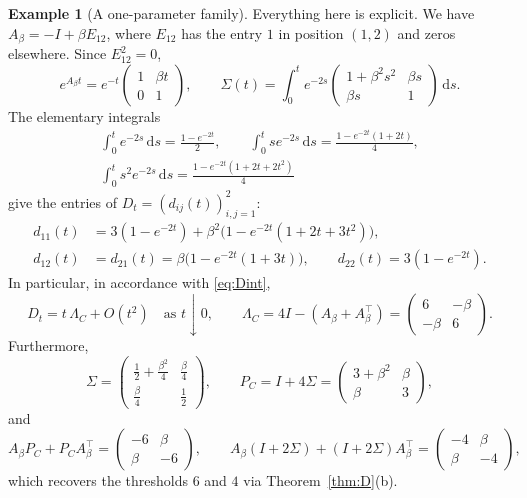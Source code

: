\documentclass[11pt]{amsart}
\numberwithin{equation}{section}
\theoremstyle{definition}
\newtheorem{example}[theorem]{Example}
\theoremstyle{remark}
\newcommand{\dd}{\,\mathrm{d}}
\newcommand{\tp}{\top}
\begin{document}
\begin{example}[A one-parameter family]
Everything here is explicit. We have $A_\beta=-I+\beta E_{12}$, where $E_{12}$ has the entry $1$ in position $(1,2)$
and zeros elsewhere. Since $E_{12}^2=0$,
\[
e^{A_\beta t}=e^{-t}\begin{pmatrix}1&\beta t\\0&1\end{pmatrix},\qquad
\Sigma(t)=\int_0^te^{-2s}\begin{pmatrix}1+\beta^2s^2&\beta s\\\beta s&1\end{pmatrix}\dd s .
\]
The elementary integrals
\begin{gather*}
\int_0^te^{-2s}\dd s=\frac{1-e^{-2t}}2,\qquad\int_0^tse^{-2s}\dd s=\frac{1-e^{-2t}(1+2t)}4,\\
\int_0^ts^2e^{-2s}\dd s=\frac{1-e^{-2t}(1+2t+2t^2)}4
\end{gather*}
give the entries of $D_t=(d_{ij}(t))_{i,j=1}^2$:
\begin{align*}
d_{11}(t)&=3(1-e^{-2t})+\beta^2\bigl(1-e^{-2t}(1+2t+3t^2)\bigr),\\
d_{12}(t)&=d_{21}(t)=\beta\bigl(1-e^{-2t}(1+3t)\bigr),\qquad d_{22}(t)=3(1-e^{-2t}).
\end{align*}
In particular, in accordance with \eqref{eq:Dint},
\[
D_t=t\,\Lambda_C+O(t^2)\quad\text{as }t\downarrow0,\qquad
\Lambda_C=4I-(A_\beta+A_\beta^\tp)=\begin{pmatrix}6&-\beta\\-\beta&6\end{pmatrix}.
\]
Furthermore,
\[
\Sigma=\begin{pmatrix}\frac12+\frac{\beta^2}4&\frac\beta4\\[2pt]\frac\beta4&\frac12\end{pmatrix},\qquad
P_C=I+4\Sigma=\begin{pmatrix}3+\beta^2&\beta\\\beta&3\end{pmatrix},
\]
and
\[
A_\beta P_C+P_CA_\beta^\tp=\begin{pmatrix}-6&\beta\\\beta&-6\end{pmatrix},\qquad
A_\beta(I+2\Sigma)+(I+2\Sigma)A_\beta^\tp=\begin{pmatrix}-4&\beta\\\beta&-4\end{pmatrix},
\]
which recovers the thresholds $6$ and $4$ via Theorem~\ref{thm:D}(b).


\end{example}
\end{document}
